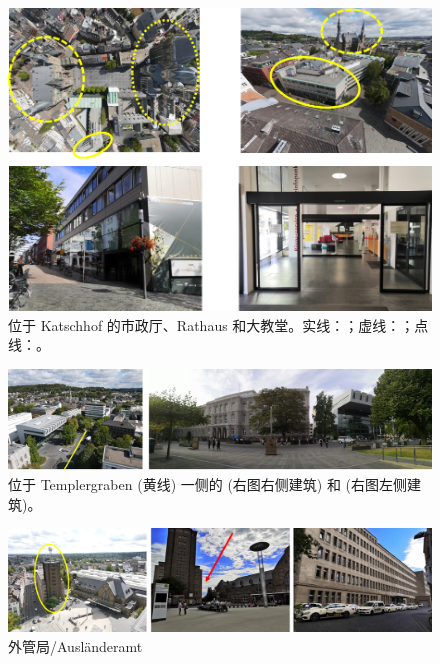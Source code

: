     \begin{figure}[ht]
      \centering
      \includegraphics[width=\textwidth]{初来乍到/Bürgerservice/位于 Katschhof 的市政厅、Rathaus 和大教堂.png}
      \caption{位于 Katschhof 的市政厅、Rathaus 和大教堂。实线：；虚线：；点线：。}
      \label{fig:位于 Katschhof 的市政厅、Rathaus 和大教堂}
    \end{figure}

    \begin{figure}[ht]
      \centering
      \includegraphics[width=\textwidth]{初来乍到/Bürgerservice/SuperC 和 Templergraben 和 Hauptgebäude.png}
      \caption{位于 Templergraben (黄线) 一侧的  (右图右侧建筑) 和  (右图左侧建筑)。}
      \label{fig:SuperC、Templergraben 和 Hauptgebäude}
    \end{figure}

    \begin{figure}[ht]
      \centering
      \includegraphics[width=\textwidth]{初来乍到/Bürgerservice/外管局.png}
      \caption{外管局/Ausländeramt}
      \label{fig:外管局/Ausländeramt}
    \end{figure}

